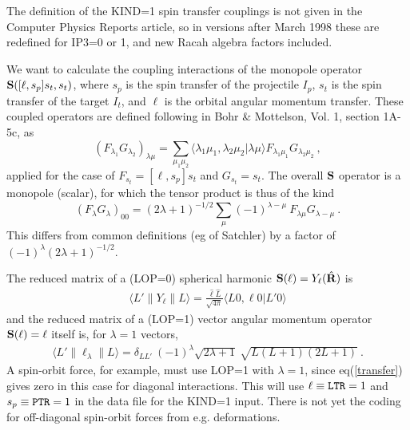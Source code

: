 \documentclass[11pt]{article}
\begin{document}
The definition of the KIND=1 spin transfer couplings is not given
in the Computer Physics Reports article, so in versions after March 1998 these
are redefined for IP3=0 or 1, and new Racah algebra factors included.

\bigskip

We want to calculate the coupling interactions of the monopole operator
$   {\bf S}([\ell,s_p]s_t,s_t)  $, where $s_p$ is the spin transfer of the
projectile $I_p$,  $s_t$ is the spin transfer of the
target $I_t$, and $\ell$ is the orbital angular momentum transfer.
These coupled operators are defined following in Bohr \& Mottelson, Vol.
1, section 1A-5c, as
\begin{equation}
(F_{\lambda_1} G_{\lambda_2})_{\lambda \mu}
  = \sum_{\mu_1 \mu_2} \langle \lambda_1 \mu_1 ,  \lambda_2 \mu_2
  |  \lambda \mu \rangle F_{\lambda_1\mu_1} G_{\lambda_2\mu_2} \ ,
\end{equation}
applied for the case of $F_{s_t} = [\ell,s_p]s_t$ and $ G_{s_t}=s_t$.
The overall ${\bf S}$ operator is a monopole (scalar), for which the tensor
product is thus of the kind
\begin{equation}
(F_{\lambda} G_{\lambda})_{00}
  = (2\lambda+1)^{-1/2} \sum_{\mu} (-1)^{\lambda-\mu} ~ F_{\lambda\mu}
  G_{\lambda-\mu} \ .
\end{equation}
This differs from common definitions (eg of Satchler) by a factor of
$ (-1)^\lambda (2\lambda+1)^{-1/2} $.

\bigskip

%
The reduced matrix of a (LOP=0)  spherical harmonic  ${\bf S}(\ell) = Y_\ell (\hat{\bf R})$ is
\begin{eqnarray}
\langle L' \parallel Y_\ell  \parallel L \rangle = 
\frac{\hat{\ell}\hat{L}}{\sqrt{4\pi}}  \langle L 0, \ell 0 | L' 0 \rangle   \label{transfer}
\end{eqnarray}
and the reduced matrix of a (LOP=1) vector angular momentum operator  ${\bf S}(\ell) = {\bf \ell}$ itself is, for $\lambda=1$ vectors, 
\begin{eqnarray}
\langle L' \parallel  \ell_\lambda  \parallel L \rangle = \delta_{LL'} ~ (-1)^\lambda \sqrt{2\lambda+1} ~ \sqrt{ L  (L+1) (2L+1) }  \ .
  \label{operator}
\end{eqnarray}
A spin-orbit force, for example, must use LOP=1 with $\lambda=1$, since eq(\ref{transfer}) gives zero in this case for diagonal interactions.  
This will use $\ell \equiv {\tt LTR} = 1$  and   $s_p \equiv {\tt PTR} = 1$ in the data file for the KIND=1 input.  There is not yet the coding for off-diagonal spin-orbit forces from e.g. deformations.\\
\end{document}
